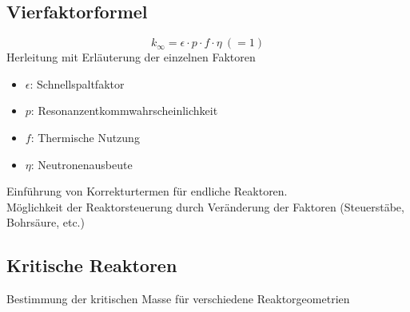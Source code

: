 \documentclass[11pt,a4paper]{article}
\begin{document}
\subsection{Vierfaktorformel}
\[
k_\infty = \epsilon \cdot p \cdot f \cdot \eta\ ( = 1)
\]
Herleitung mit Erläuterung der einzelnen Faktoren
\begin{itemize}
\item $\epsilon$: Schnellspaltfaktor
\item $p$: Resonanzentkommwahrscheinlichkeit
\item $f$: Thermische Nutzung
\item $\eta$: Neutronenausbeute
\end{itemize}
Einführung von Korrekturtermen für endliche Reaktoren. \\ Möglichkeit der Reaktorsteuerung durch Veränderung der Faktoren (Steuerstäbe, Bohrsäure, etc.)
\subsection{Kritische Reaktoren}
Bestimmung der kritischen Masse für verschiedene Reaktorgeometrien
\end{document}
